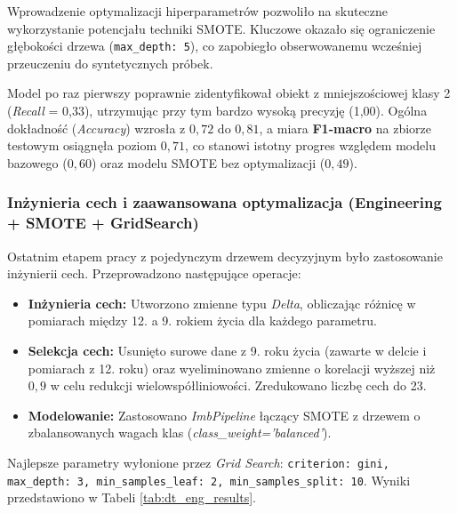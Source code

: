 \documentclass[12pt, a4paper]{article}
\begin{document}
Wprowadzenie optymalizacji hiperparametrów pozwoliło na skuteczne wykorzystanie potencjału techniki SMOTE. Kluczowe okazało się ograniczenie głębokości drzewa (\texttt{max\_depth: 5}), co zapobiegło obserwowanemu wcześniej przeuczeniu do syntetycznych próbek. 

Model po raz pierwszy poprawnie zidentyfikował obiekt z mniejszościowej klasy 2 (\textit{Recall} = 0,33), utrzymując przy tym bardzo wysoką precyzję (1,00). Ogólna dokładność (\textit{Accuracy}) wzrosła z $0{,}72$ do $0{,}81$, a miara \textbf{F1-macro} na zbiorze testowym osiągnęła poziom $0{,}71$, co stanowi istotny progres względem modelu bazowego ($0{,}60$) oraz modelu SMOTE bez optymalizacji ($0{,}49$).


\subsubsection*{Inżynieria cech i zaawansowana optymalizacja (Engineering + SMOTE + GridSearch)}

Ostatnim etapem pracy z pojedynczym drzewem decyzyjnym było zastosowanie inżynierii cech. Przeprowadzono następujące operacje:
\begin{itemize}
    \item \textbf{Inżynieria cech:} Utworzono zmienne typu \textit{Delta}, obliczając różnicę w pomiarach między 12. a 9. rokiem życia dla każdego parametru.
    \item \textbf{Selekcja cech:} Usunięto surowe dane z 9. roku życia (zawarte w delcie i pomiarach z 12. roku) oraz wyeliminowano zmienne o korelacji wyższej niż $0,9$ w celu redukcji wielowspółliniowości. Zredukowano liczbę cech do 23.
    \item \textbf{Modelowanie:} Zastosowano \textit{ImbPipeline} łączący SMOTE z drzewem o zbalansowanych wagach klas (\textit{class\_weight='balanced'}).
\end{itemize}

Najlepsze parametry wyłonione przez \textit{Grid Search}: \texttt{criterion: gini, max\_depth: 3, min\_samples\_leaf: 2, min\_samples\_split: 10}. Wyniki przedstawiono w Tabeli \ref{tab:dt_eng_results}.
\end{document}

